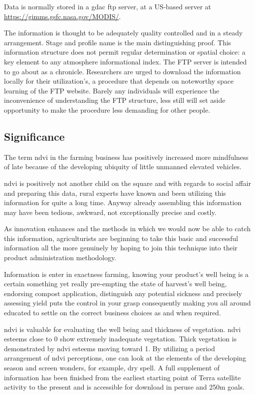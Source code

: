 Data is normally stored in a \gls{gdac} \gls{ftp} server, at a US-based server at \url{https://gimms.gsfc.nasa.gov/MODIS/}.

The information is thought to be adequately quality controlled and in a steady arrangement. Stage and profile name is the main distinguishing proof. This information structure does not permit regular determination or spatial choice: a key element to any atmosphere informational index. The FTP server is intended to go about as a chronicle. Researchers are urged to download the information locally for their utilization's, a procedure that depends on noteworthy space learning of the FTP website. Barely any individuals will experience the inconvenience of understanding the FTP structure, less still will set aside opportunity to make the procedure less demanding for other people.

\subsection{Significance}

The term \gls{ndvi} in the farming business has positively increased more mindfulness of late because of the developing ubiquity of little unmanned elevated vehicles. 

\gls{ndvi} is positively not another child on the square and with regards to social affair and preparing this data, rural experts have known and been utilizing this information for quite a long time. Anyway already assembling this information may have been tedious, awkward, not exceptionally precise and costly. 

As innovation enhances and the methods in which we would now be able to catch this information, agriculturists are beginning to take this basic and successful information all the more genuinely by hoping to join this technique into their product administration methodology. 

Information is enter in exactness farming, knowing your product's well being is a certain something yet really pre-empting the state of harvest's well being, endorsing compost application, distinguish any potential sickness and precisely assessing yield puts the control in your grasp consequently making you all around educated to settle on the correct business choices as and when required.

\gls{ndvi} is valuable for evaluating the well being and thickness of vegetation. \gls{ndvi} esteems close to 0 show extremely inadequate vegetation. Thick vegetation is demonstrated by \gls{ndvi} esteems moving toward 1. By utilizing a period arrangement of \gls{ndvi} perceptions, one can look at the elements of the developing season and screen wonders, for example, dry spell. A full supplement of information has been finished from the earliest starting point of Terra satellite activity to the present and is accessible for download in peruse and 250m goals.


